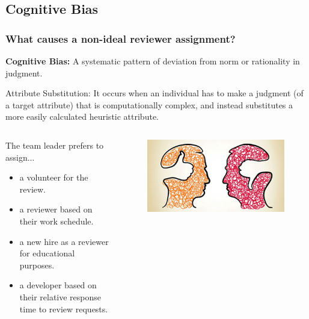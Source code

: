 \documentclass{beamer}
\begin{document}
\subsection{Cognitive Bias}
\begin{frame}
\frametitle{\large What causes a non-ideal reviewer assignment?}
    \textbf{Cognitive Bias:} A systematic pattern of deviation from norm or rationality in judgment.
     \begin{block}{Attribute Substitution:}
        It occurs when an individual has to make a judgment (of a target attribute) that is computationally complex, and instead substitutes a more easily calculated heuristic attribute.
    \end{block}
    
    \begin{columns}
    \begin{column}{0.6\textwidth}
    The team leader prefers to assign...
      \begin{itemize}
    \item  a volunteer for the review.
    \item   a reviewer based on their work schedule.
    \item a new hire as a reviewer for educational purposes.
    \item a developer based on their relative response time to review requests.
    \end{itemize}
    \end{column}
    \begin{column}{0.4\textwidth}  %
      \begin{figure}
      \includegraphics[scale=0.2]{img/cog_bias.jpg}
      \end{figure}
\end{column}
\end{columns}


\end{frame}
\end{document}
